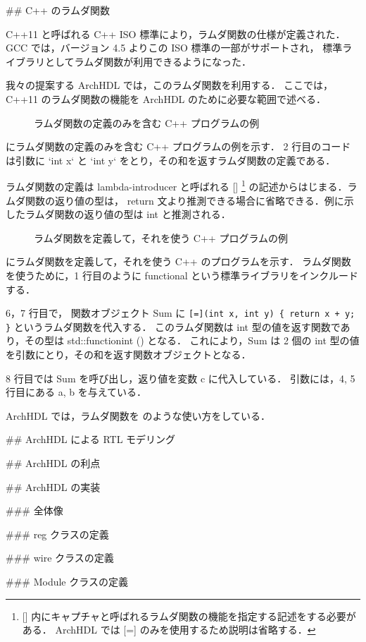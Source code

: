 ## C++ のラムダ関数

C++11 と呼ばれる C++ ISO 標準により，ラムダ関数の仕様が定義された．
GCC では，バージョン 4.5 よりこの ISO 標準の一部がサポートされ，
標準ライブラリとしてラムダ関数が利用できるようになった．

我々の提案する ArchHDL では，このラムダ関数を利用する．
ここでは，C++11 のラムダ関数の機能を ArchHDL のために必要な範囲で述べる．

\begin{figure}[t]
 
 \caption{ラムダ関数の定義のみを含む C++ プログラムの例}
 \label{src:def_lambda}
\end{figure}

 にラムダ関数の定義のみを含む C++ プログラムの例を示す．
2 行目のコードは引数に `int x` と `int y` をとり，その和を返すラムダ関数の定義である．

ラムダ関数の定義は lambda-introducer と呼ばれる [] \footnote{
[] 内にキャプチャと呼ばれるラムダ関数の機能を指定する記述をする必要がある．
ArchHDL では [=] のみを使用するため説明は省略する．
}
の記述からはじまる．ラムダ関数の返り値の型は，
return 文より推測できる場合に省略できる．例に示したラムダ関数の返り値の型は
int と推測される．

\begin{figure}[t]
 
 \caption{ラムダ関数を定義して，それを使う C++ プログラムの例}
 \label{src:ex_lambda}
\end{figure}

 にラムダ関数を定義して，それを使う C++ のプログラムを示す．
ラムダ関数を使うために，1 行目のように functional という標準ライブラリをインクルードする．

6，7 行目で， 関数オブジェクト Sum に
\verb`[=](int x, int y) { return x + y; }`
というラムダ関数を代入する．
このラムダ関数は int 型の値を返す関数であり，その型は std::function\<int ()\> となる．
これにより，Sum は 2 個の int 型の値を引数にとり，その和を返す関数オブジェクトとなる．

8 行目では Sum を呼び出し，返り値を変数 c に代入している．
引数には，4, 5 行目にある a, b を与えている．

ArchHDL では，ラムダ関数を  のような使い方をしている．


## ArchHDL による RTL モデリング







## ArchHDL の利点







## ArchHDL の実装









### 全体像







### reg クラスの定義





### wire クラスの定義





### Module クラスの定義





